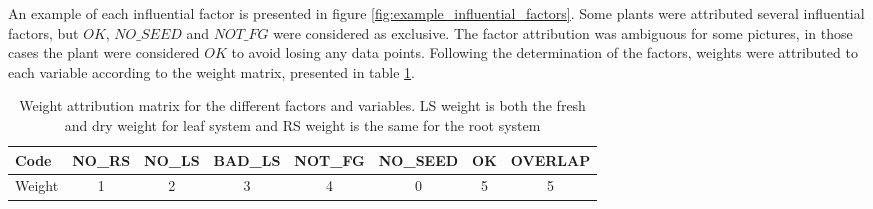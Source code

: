 An example of each influential factor is presented in figure \ref{fig:example_influential_factors}. Some plants were attributed several influential factors, but $OK$, $NO\_SEED$ and $NOT\_FG$ were considered as exclusive. The factor attribution was ambiguous for some pictures, in those cases the plant were considered $OK$ to avoid losing any data points.
Following the determination of the factors, weights were attributed to each variable according to the weight matrix, presented in table \ref{tab:weight_attribution_matrix}.


\begin{table}[htbp]
  \centering
  \caption[Weight attribution matrix]{Weight attribution matrix for the different factors and variables. LS weight is both the fresh and dry weight for leaf system and RS weight is the same for the root system}
    \begin{tabular}{lccccccc}
    \toprule
    Code  & NO\_RS & NO\_LS & BAD\_LS & NOT\_FG & NO\_SEED & OK & OVERLAP \\
    \midrule
    Weight & 1 & 2 & 3 & 4 & 0 & 5 & 5\\
    \bottomrule
    \end{tabular}%
  \label{tab:weight_attribution_matrix}%
\end{table}%


